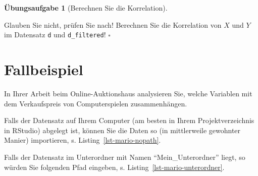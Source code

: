 \documentclass[
  letterpaper,
]{scrbook}
\newenvironment{Shaded}{\begin{snugshade}}{\end{snugshade}}
\newcommand{\FunctionTok}[1]{\textcolor[rgb]{0.28,0.35,0.67}{#1}}
\newcommand{\NormalTok}[1]{\textcolor[rgb]{0.00,0.23,0.31}{#1}}
\newcommand{\OtherTok}[1]{\textcolor[rgb]{0.00,0.23,0.31}{#1}}
\newcommand{\StringTok}[1]{\textcolor[rgb]{0.13,0.47,0.30}{#1}}
\theoremstyle{definition}
\theoremstyle{definition}
\theoremstyle{definition}
\newtheorem{exercise}{Übungsaufgabe}[chapter]
\theoremstyle{remark}
\begin{document}
\begin{exercise}[Berechnen Sie die
Korrelation]\protect\hypertarget{exr-corr-range}{}\label{exr-corr-range}

Glauben Sie nicht, prüfen Sie nach! Berechnen Sie die Korrelation von
\(X\) und \(Y\) im Datensatz \texttt{d} und \texttt{d\_filtered}!
\(\square\)

\end{exercise}

\section{Fallbeispiel}\label{fallbeispiel}

In Ihrer Arbeit beim Online-Auktionshaus analysieren Sie, welche
Variablen mit dem Verkaufspreis von Computerspielen zusammenhängen.

Falls der Datensatz auf Ihrem Computer (am besten in Ihrem
Projektverzeichnis in RStudio) abgelegt ist, können Sie die Daten so (in
mittlerweile gewohnter Manier) importieren, s.
Listing~\ref{lst-mario-nopath}.

\begin{codelisting}

\caption{\label{lst-mario-nopath}Mariokart importieren, wenn die
CSV-Datei im aktuellen Projektordner liegt.}

\centering{

\begin{Shaded}
\begin{Highlighting}[]
\NormalTok{mariokart }\OtherTok{\textless{}{-}} \FunctionTok{read.csv}\NormalTok{(}\StringTok{"mariokart.csv"}\NormalTok{)}
\end{Highlighting}
\end{Shaded}

}

\end{codelisting}%

Falls der Datensatz im Unterordner mit Namen ``Mein\_Unterordner''
liegt, so würden Sie folgenden Pfad eingeben, s.
Listing~\ref{lst-mario-unterordner}.

\begin{codelisting}

\caption{\label{lst-mario-unterordner}Den Datensatz Mariokart
importieren, wenn die CSV-Datei im Unterordner
\texttt{Mein\_Unterordner} liegt.}

\centering{

\begin{Shaded}
\begin{Highlighting}[]
\NormalTok{mariokart }\OtherTok{\textless{}{-}} \FunctionTok{read.csv}\NormalTok{(}\StringTok{"Mein\_Unterordner/mariokart.csv"}\NormalTok{)}
\end{Highlighting}
\end{Shaded}

}

\end{codelisting}%
\end{document}
